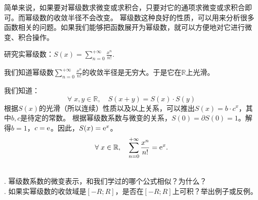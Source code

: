 \documentclass[12pt,UTF8]{ctexbook}
\begin{document}
简单来说，如果要对幂级数求微变或求积合，只要对它的通项求微变或求积合即可。而幂级数的收敛半径不会改变。
幂级数这种良好的性质，可以用来分析很多函数相关的问题。如果我们能够把函数展开为幂级数，就可以方便地对它进行微变、积合操作。

\begin{et}
    研究实幂级数：$S(x) = \sum_{n=0}^{+\infty} \frac{x^n}{n!}. $
\end{et}

\begin{so}
    我们知道幂级数$\sum_{n=0}^{+\infty} \frac{x^n}{n!}$的收敛半径是无穷大。于是它在$\mathbb{R}$上光滑。

    我们知道：
    $$ \forall \; x, y \in \mathbb{R}, \quad S(x + y) = S(x)\cdot S(y) $$
    根据$S(x)$的光滑（所以连续）性质以及以上关系，可以推出$S(x) = b\cdot c^x$，其中$b,c$是待定的常数。
    根据幂级数系数与微变的关系，$S(0) = \partial S(0) = 1$。解得$b=1$，$c=\mathrm{e}$。因此，$S(x) = \mathrm{e}^x$。
    $$ \forall \;x\in\mathbb{R}, \quad \sum_{n=0}^{+\infty} \frac{x^n}{n!} = \mathrm{e}^x. $$
\end{so}


\begin{sk}
    \mbox{} \\
    . 幂级数系数的微变表示，和我们学过的哪个公式相似？为什么？\\
    . 如果实幂级数的收敛域是$[-R;R]$，是否在$[-R;R]$上可积？举出例子或反例。
\end{sk}
\end{document}

